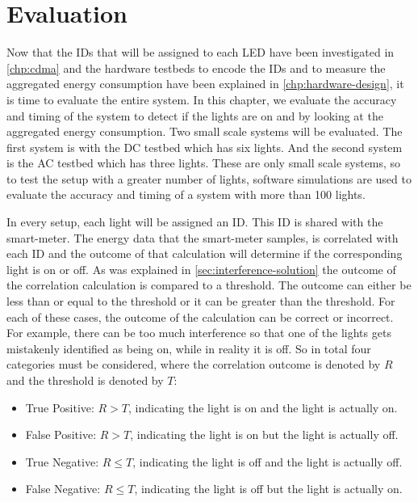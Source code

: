 
\chapter{Evaluation}
\label{chp:evaluation}




Now that the IDs that will be assigned to each LED have been investigated in \autoref{chp:cdma} and the hardware testbeds to encode the IDs and to measure the aggregated energy consumption have been explained in \autoref{chp:hardware-design}, it is time to evaluate the entire system.
In this chapter, we evaluate the accuracy and timing of the system to detect if the lights are on and by looking at the aggregated energy consumption.
Two small scale systems will be evaluated.
The first system is with the DC testbed which has six lights.
And the second system is the AC testbed which has three lights.
These are only small scale systems, so to test the setup with a greater number of lights, software simulations are used to evaluate the accuracy and timing of a system with more than 100 lights.




In every setup, each light will be assigned an ID.
This ID is shared with the smart-meter.%
The energy data that the smart-meter samples, is correlated with each ID and the outcome of that calculation will determine if the corresponding light is on or off.
As was explained in \autoref{sec:interference-solution} the outcome of the correlation calculation is compared to a threshold.
The outcome can either be less than or equal to the threshold or it can be greater than the threshold.
For each of these cases, the outcome of the calculation can be correct or incorrect.
For example, there can be too much interference so that one of the lights gets mistakenly identified as being on, while in reality it is off.
So in total four categories must be considered, where the correlation outcome is denoted by $R$ and the threshold is denoted by $T$:




\begin{itemize}

	\item True Positive: $R > T$, indicating the light is on and the light is actually on.

	\item False Positive: $R > T$, indicating the light is on but the light is actually off.

	\item True Negative: $R \le T$, indicating the light is off and the light is actually off.

	\item False Negative: $R \le T$, indicating the light is off but the light is actually on.


\end{itemize}




